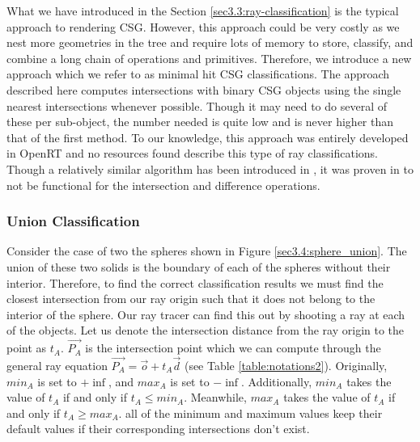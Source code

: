 \documentclass[a4paper,11pt,oneside]{article}
\begin{document}
What we have introduced in the Section \ref{sec3.3:ray-classification} is the typical approach to rendering CSG. However, this approach could be very costly as we nest more geometries in the tree and require lots of memory to store, classify, and combine a long chain of operations and primitives. Therefore, we introduce a new approach which we refer to as minimal hit CSG classifications. The approach described here computes intersections with binary CSG objects using the single nearest intersections whenever possible. Though it may need to do several of these per sub-object, the number needed is quite low and is never higher than that of the first method. To our knowledge, this approach was entirely developed in OpenRT and no resources found describe this type of ray classifications. Though a relatively similar algorithm has been introduced in \cite{kensler_ray_2006}, it was proven in \cite{csg-xrt-renderer} to not be functional for the intersection and difference operations.

\subsubsection{Union Classification}

Consider the case of two the spheres shown in Figure \ref{sec3.4:sphere_union}. The union of these two solids is the boundary of each of the spheres without their interior. Therefore, to find the correct classification results we must find the closest intersection from our ray origin such that it does not belong to the interior of the sphere. Our ray tracer can find this out by shooting a ray at each of the objects. Let us denote the intersection distance from the ray origin to the point as $t_A$. $\vec{P_A}$ is the intersection point which we can compute through the general ray equation $\vec{P_A} = \vec{o} + t_{A}\vec{d}$ (see Table \ref{table:notations2}). Originally, $min_A$ is set to $+\inf$, and $max_A$ is set to $-\inf$. Additionally, $min_A$ takes the value of $t_A$ if and only if $t_A \leq min_A$. Meanwhile, $max_A$ takes the value of $t_A$ if and only if $t_A \geq max_A$. all of the minimum and maximum values keep their default values if their corresponding intersections don't exist. 
\end{document}
